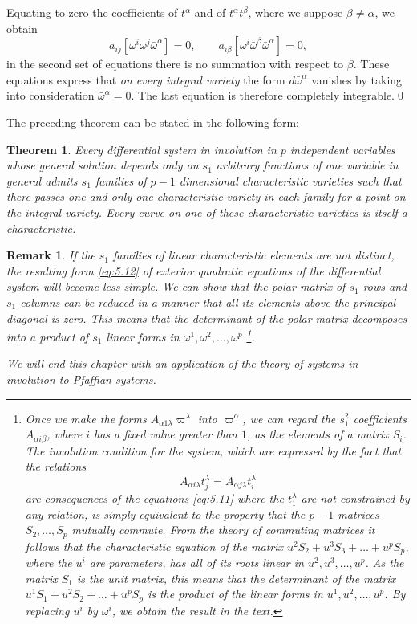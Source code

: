 \documentclass[leqno,11pt]{book}
\numberwithin{equation}{chapter}
\theoremstyle{shape1}
\newtheorem*{thm*}{\hspace{15pt}Theorem}
\theoremstyle{shape0}
\newtheorem*{rmk*}{\hspace{15pt}Remark}
\theoremstyle{shape2}
\theoremstyle{definition}
\begin{document}
Equating to zero the coefficients of $t^{\alpha}$ and of $t^{\alpha}t^{\beta}$, where we suppose $\beta\neq\alpha$, we obtain
\[
a_{ij}[\omega^{i}\omega^{j}\bar\omega^{\alpha}]=0,\qquad a_{i\beta}[\omega^{i}\bar\omega^{\beta}\bar\omega^{\alpha}]=0,
\]
in the second set of equations there is no summation with respect to $\beta$. These equations express that \emph{on every integral variety} the form $d\bar\omega^{\alpha}$ vanishes by taking into consideration $\bar\omega^{\alpha}=0$. The last equation is therefore completely integrable.\qed


\vspace{12pt}\fsec The preceding theorem can be stated in the following form:
\begin{thm*}
  Every differential system in involution in $p$ independent variables whose general solution depends only on $s_{1}$ arbitrary functions of one variable in general admits $s_{1}$ families of $p-1$ dimensional characteristic varieties such that there passes one and only one characteristic variety in each family for a point on the integral variety. Every curve on one of these characteristic varieties is itself a characteristic.
\end{thm*}

\begin{rmk*}
  If the $s_{1}$ families of linear characteristic elements are not distinct, the resulting form \eqref{eq:5.12} of exterior quadratic equations of the differential system will become less simple. We can show that the polar matrix of $s_{1}$ rows and $s_{1}$ columns can be reduced in a manner that all its elements above the principal diagonal is zero. This means that \emph{the determinant of the polar matrix decomposes into a product of $s_{1}$ linear forms in $\omega^{1},\omega^{2},\dots,\omega^{p}$} \footnote{Once we make the forms $A_{\alpha1\lambda}\varpi^{\lambda}$ into $\varpi^{\alpha}$, we can regard the $s_{1}^{2}$ coefficients $A_{\alpha i\beta}$, where $i$ has a fixed value greater than $1$, as the elements of a matrix $S_{i}$. The involution condition for the system, which are expressed by the fact that the relations
\[
A_{\alpha i\lambda}t^{\lambda}_{j}=A_{\alpha j\lambda}t^{\lambda}_{i}
\]
are consequences of the equations \eqref{eq:5.11} where the $t_{1}^{\lambda}$ are not constrained by any relation, is simply equivalent to the property that the $p-1$ matrices $S_{2},\dots,S_{p}$ mutually commute. From the theory of commuting matrices it follows that the characteristic equation of the matrix $u^{2}S_{2}+u^{3}S_{3}+\dots+u^{p}S_{p}$, where the $u^{i}$ are parameters, has all of its roots linear in $u^{2},u^{3},\dots,u^{p}$. As the matrix $S_{1}$ is the unit matrix, this means that the determinant of the matrix $u^{1}S_{1}+u^{2}S_{2}+\dots+u^{p}S_{p}$ is the product of the linear forms in $u^{1},u^{2},\dots,u^{p}$. By replacing $u^{i}$ by $\omega^{i}$, we obtain the result in the text.
}.

We will end this chapter with an application of the theory of systems in involution to Pfaffian systems.

\end{rmk*}
\end{document}
